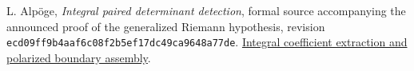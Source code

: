 L. Alp\"oge, \emph{Integral paired determinant detection},
formal source accompanying the announced proof of the generalized
Riemann hypothesis, revision
\texttt{ecd09ff9b4aaf6c08f2b5ef17dc49ca9648a77de}.
\href{https://github.com/jsmorph/rh/blob/ecd09ff9b4aaf6c08f2b5ef17dc49ca9648a77de/lean/src/Development/AutomorphicArithmetic/AutomorphicVarieties/PatchingModules/DeterminantPadicFree/DetAsm.lean}{Integral coefficient extraction and polarized boundary assembly}.
